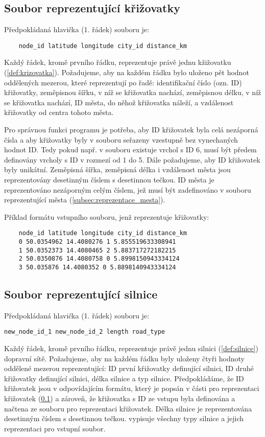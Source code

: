 \subsection{Soubor reprezentující křižovatky}
\label{subsec:reprezentace_krizovatky}

Předpokládaná hlavička (1. řádek) souboru je:
\begin{Verbatim}
    node_id latitude longitude city_id distance_km 
\end{Verbatim}

Každý řádek, kromě prvního řádku, reprezentuje právě jednu kžižovatku (\cref{def:krizovatka}).
Požadujeme, aby na každém řádku bylo uloženo pět hodnot oddělených mezerou, které 
reprezentují po řadě: identifikační číslo (ozn. ID) křižovatky, zeměpisnou šířku,
v níž se křižovatka nachází, zeměpisnou délku, v níž se křižovatka nachází,
ID města, do něhož křižovatka náleží, a vzdálenost křižovatky od centra tohoto města.

Pro správnou funkci programu je potřeba, aby ID křižovatek byla celá nezáporná 
čísla a aby křižovatky byly v souboru seřazeny vzestupně bez vynechaných hodnot ID.
Tedy pokud např. v souboru existuje vrchol s ID 6, musí být předem definovány
vrcholy s ID v rozmezí od 1 do 5. Dále požadujeme, aby ID křižovatek byly unikátní.
Zeměpisná šířka, zeměpisná délka i vzdálenost města jsou reprezentovány 
desetinným číslem s desetinnou tečkou. ID města je reprezentováno nezáporným
celým číslem, jež musí být zadefinováno v souboru reprezentující města 
(\cref{subsec:reprezentace_mesta}).


Příklad formátu vstupního souboru, jenž reprezentuje křižovatky:
\begin{Verbatim}
    node_id latitude longitude city_id distance_km
    0 50.0354962 14.4080276 1 5.855519633308941 
    1 50.0352373 14.4080465 2 5.883717272182215 
    2 50.0350876 14.4080758 0 5.8998150943334124
    3 50.035876 14.4080352 0 5.8898140943334124
\end{Verbatim}


\subsection{Soubor reprezentující silnice}

Předpokládaná hlavička (1. řádek) souboru je:
\begin{Verbatim}
new_node_id_1 new_node_id_2 length road_type
\end{Verbatim}
Každý řádek, kromě prvního řádku, reprezentuje právě jednu silnici (\cref{def:silnice})
dopravní sítě. Požadujeme, aby na každém řádku byly uloženy čtyři hodnoty oddělené
mezerou reprezentující: ID první křižovatky definující silnici, ID druhé
křižovatky definující silnici, délka silnice a typ silnice.
Předpokládáme, že ID křižovatek jsou v odpovídajícím formátu, 
který je popsán v části pro reprezentaci křižovatek (\cref{subsec:reprezentace_krizovatky})
a zároveň, že křižovatka s ID ze vstupu byla definována a načtena ze souboru 
pro reprezentaci křižovatek.
Délka silnice je reprezentována desetinným číslem s desetinnou tečkou.
 vypisuje všechny typy silnice a jejich reprezentaci pro
vstupní soubor.

